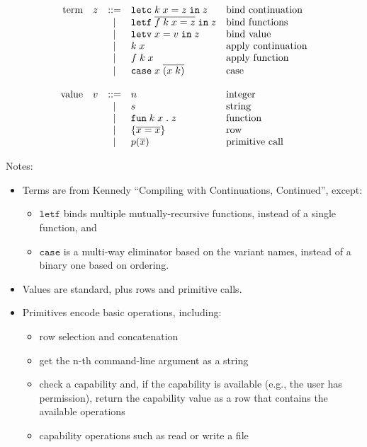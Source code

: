\documentclass[11pt]{article}
\newcommand{\kw}[1]{\mathtt{#1}}
\begin{document}
\[
\begin{array}{rlcll}
\text{term}
  & z & ::= & \letc{k}{x}{z}{z}              & \text{bind continuation} \\
  &   & |   & \letf{\defterm{f}{k}{x}{z}}{z} & \text{bind functions} \\
  &   & |   & \letv{x}{v}{z}                 & \text{bind value} \\
  &   & |   & \appc{k}{x}                    & \text{apply continuation} \\
  &   & |   & \appf{f}{k}{x}                 & \text{apply function} \\
  &   & |   & \casv{x}{x}{k}                 & \text{case} \\

\\
\text{value}
  & v & ::= & \intv{n}           & \text{integer}  \\
  &   & |   & \strv{s}           & \text{string} \\
  &   & |   & \funv{k}{x}{z}     & \text{function} \\
  &   & |   & \recv{x}{x}        & \text{row} \\
  &   & |   & \prmv{p}{\repo{x}}  & \text{primitive call} \\
\end{array}
\]

Notes:
\begin{itemize}
\item Terms are from Kennedy ``Compiling with Continuations, Continued'', except:
\begin{itemize}
\item $\kw{letf}$ binds multiple mutually-recursive functions, instead of a single function, and
\item $\kw{case}$ is a multi-way eliminator based on the variant names, instead of a binary one based on ordering.
\end{itemize}
\item Values are standard, plus rows and primitive calls.
\item Primitives encode basic operations, including:
\begin{itemize}
\item row selection and concatenation
\item get the n-th command-line argument as a string
\item check a capability and, if the capability is available (e.g., the user has permission), return the capability value as a row that contains the available operations
\item capability operations such as read or write a file
\end{itemize}
\end{itemize}
\end{document}
